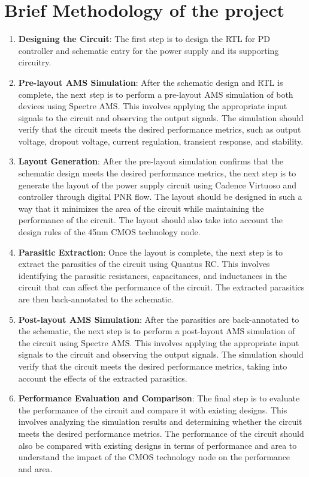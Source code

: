 \section[Brief Methodology of the project]{\textbf{Brief Methodology of the project}}
\begin{enumerate}
    \item \textbf{Designing the Circuit}: The first step is to design the RTL for PD controller and schematic entry for the power supply and its supporting circuitry.
    \item \textbf{Pre-layout AMS Simulation}: After the schematic design and RTL is complete, the next step is to perform a pre-layout AMS simulation of both devices using Spectre AMS. This involves applying the appropriate input signals to the circuit and observing the output signals. The simulation should verify that the circuit meets the desired performance metrics, such as output voltage, dropout voltage, current regulation, transient response, and stability.
    \item \textbf{Layout Generation}: After the pre-layout simulation confirms that the schematic design meets the desired performance metrics, the next step is to generate the layout of the power supply circuit using Cadence Virtuoso and controller through digital PNR flow. The layout should be designed in such a way that it minimizes the area of the circuit while maintaining the performance of the circuit. The layout should also take into account the design rules of the 45nm CMOS technology node.
    \item \textbf{Parasitic Extraction}: Once the layout is complete, the next step is to extract the parasitics of the circuit using Quantus RC. This involves identifying the parasitic resistances, capacitances, and inductances in the circuit that can affect the performance of the circuit. The extracted parasitics are then back-annotated to the schematic.
    \item \textbf{Post-layout AMS Simulation}: After the parasitics are back-annotated to the schematic, the next step is to perform a post-layout AMS simulation of the circuit using Spectre AMS. This involves applying the appropriate input signals to the circuit and observing the output signals. The simulation should verify that the circuit meets the desired performance metrics, taking into account the effects of the extracted parasitics.
    \item \textbf{Performance Evaluation and Comparison}: The final step is to evaluate the performance of the circuit and compare it with existing designs. This involves analyzing the simulation results and determining whether the circuit meets the desired performance metrics. The performance of the circuit should also be compared with existing designs in terms of performance and area to understand the impact of the CMOS technology node on the performance and area.
\end{enumerate}

